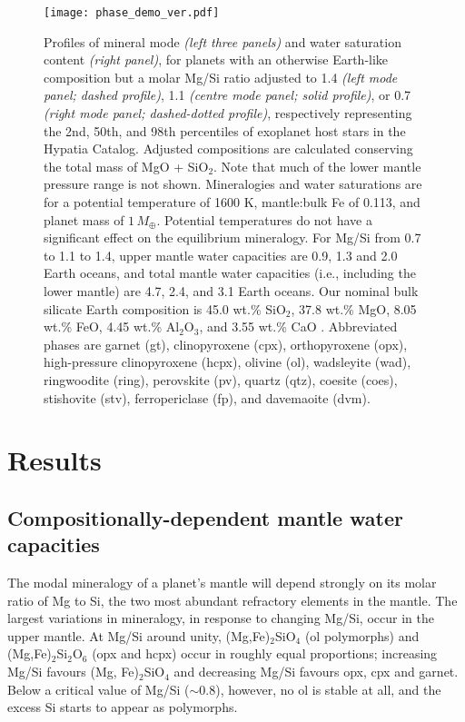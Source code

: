 \begin{figure*}
         \centering
         \texttt{[image: phase\_demo\_ver.pdf]}
        \caption[Profiles of mineral mode and water saturation content, for planets with an otherwise Earth-like composition but a varying molar Mg/Si ratio.]{Profiles of mineral mode \textit{(left three panels)} and water saturation content \textit{(right panel)}, for planets with an otherwise Earth-like composition but a molar Mg/Si ratio adjusted to 1.4 \textit{(left mode panel; dashed profile)}, 1.1 \textit{(centre mode panel; solid profile)}, or 0.7 \textit{(right mode panel; dashed-dotted profile)}, respectively representing the 2nd, 50th, and 98th percentiles of exoplanet host stars in the Hypatia Catalog. Adjusted compositions are calculated conserving the total mass of MgO + SiO$_2$. Note that much of the lower mantle pressure range is not shown. Mineralogies and water saturations are for a potential temperature of 1600 K, mantle:bulk Fe of 0.113, and planet mass of $1\,M_\oplus$. Potential temperatures do not have a significant effect on the equilibrium mineralogy. For Mg/Si from 0.7 to 1.1 to 1.4, upper mantle water capacities are 0.9, 1.3 and 2.0 Earth oceans, and total mantle water capacities (i.e., including the lower mantle) are 4.7, 2.4, and 3.1 Earth oceans. Our nominal bulk silicate Earth composition is 45.0 wt.\% SiO$_2$, 37.8 wt.\% MgO, 8.05 wt.\% FeO, 4.45 wt.\% Al$_2$O$_3$, and 3.55 wt.\% CaO \citep{mcdonough_composition_1995}. Abbreviated phases are garnet (gt), clinopyroxene (cpx), orthopyroxene (opx), high-pressure clinopyroxene (hcpx),  olivine (ol), wadsleyite (wad), ringwoodite (ring), perovskite (pv), quartz (qtz), coesite (coes), stishovite (stv), ferropericlase (fp), and davemaoite (dvm).}
        \label{fig:mgsi_modality}
\end{figure*}





\section{Results}\label{sec:results-water}

\subsection{Compositionally-dependent mantle water capacities}




The modal mineralogy of a planet's mantle will depend strongly on its molar ratio of Mg to Si, the two most abundant refractory elements in the mantle. The largest variations in mineralogy, in response to changing Mg/Si, occur in the upper mantle. At Mg/Si around unity, (Mg,Fe)$_2$SiO$_4$ (ol polymorphs) and (Mg,Fe)$_2$Si$_2$O$_6$ (opx and hcpx) occur in roughly equal proportions; increasing Mg/Si favours (Mg, Fe)$_2$SiO$_4$ and decreasing Mg/Si favours opx, cpx and garnet. Below a critical value of Mg/Si ($\sim$0.8), however, no ol is stable at all, and the excess Si starts to appear as  polymorphs.

